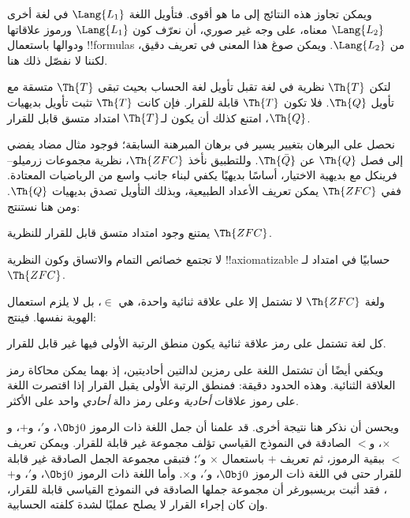 \documentclass[../../../include/open-logic-section]{subfiles}
\begin{document}


ويمكن تجاوز هذه النتائج إلى ما هو أقوى. فتأويل اللغة
$\Lang{L_1}$ في لغة أخرى $\Lang{L_2}$ معناه، على وجه غير صوري،
أن نعرّف كون $\Lang{L_1}$ ورموز علاقاتها ودوالها باستعمال
!!{formula}s من $\Lang{L_2}$. ويمكن صوغ هذا المعنى في تعريف دقيق،
لكننا لا نفصّل ذلك هنا.

\begin{thm}
  لتكن $\Th{T}$ نظرية في لغة تقبل تأويل لغة الحساب بحيث تبقى
  $\Th{T}$ متسقة مع تأويل $\Th{Q}$. فلا تكون $\Th{T}$ قابلة
  للقرار. فإن كانت $\Th{T}$ تثبت تأويل بديهيات $\Th{Q}$، امتنع
  كذلك أن يكون لـ$\Th{T}$ امتداد متسق قابل للقرار.
\end{thm}

نحصل على البرهان بتغيير يسير في برهان المبرهنة السابقة؛ فوجود
مثال مضاد يفضي إلى فصل $\Th{Q}$ عن $\Th{\bar Q}$.
وللتطبيق نأخذ $\Th{ZFC}$، نظرية مجموعات زرميلو--فرينكل مع بديهية
الاختيار، أساسًا بديهيًا يكفي لبناء جانب واسع من الرياضيات المعتادة.
ففي $\Th{ZFC}$ يمكن تعريف الأعداد الطبيعية، وبذلك التأويل تصدق
بديهيات $\Th{Q}$. ومن هنا نستنتج:

\begin{cor}
يمتنع وجود امتداد متسق قابل للقرار للنظرية $\Th{ZFC}$.
\end{cor}

\begin{cor}
لا تجتمع خصائص التمام والاتساق وكون النظرية !!{axiomatizable}
حسابيًا في امتداد لـ$\Th{ZFC}$.
\end{cor}

ولغة $\Th{ZFC}$ لا تشتمل إلا على علاقة ثنائية واحدة، هي $\in$،
بل لا يلزم استعمال الهوية نفسها. فينتج:

\begin{cor}
كل لغة تشتمل على رمز علاقة ثنائية يكون منطق الرتبة الأولى فيها
غير قابل للقرار.
\end{cor}

ويكفي أيضًا أن تشتمل اللغة على رمزين لدالتين أحاديتين، إذ بهما
يمكن محاكاة رمز العلاقة الثنائية. وهذه الحدود دقيقة: فمنطق الرتبة
الأولى يقبل القرار إذا اقتصرت اللغة على رموز علاقات \emph{أحادية}
وعلى رمز دالة \emph{أحادي} واحد على الأكثر.

ويحسن أن نذكر هنا نتيجة أخرى. قد علمنا أن جمل اللغة ذات الرموز
$\Obj 0$، و$'$، و$+$، و$\times$، و$<$ الصادقة في النموذج القياسي
تؤلف مجموعة غير قابلة للقرار. ويمكن تعريف $<$ ببقية الرموز،
ثم تعريف $+$ باستعمال $\times$ و$'$؛ فتبقى مجموعة الجمل الصادقة
غير قابلة للقرار حتى في اللغة ذات الرموز $\Obj 0$، و$'$، و$\times$.
وأما اللغة ذات الرموز $\Obj 0$، و$'$، و$+$، فقد أثبت بريسبورغر أن
مجموعة جملها الصادقة في النموذج القياسي قابلة للقرار، وإن كان إجراء
القرار لا يصلح عمليًا لشدة كلفته الحسابية.
\end{document}
